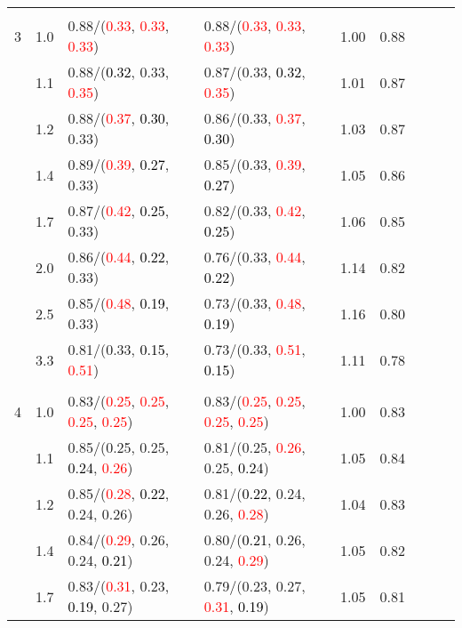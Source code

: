\documentclass[10pt,a4paper]{report}
\begin{document}
\begin{table}[!htbp]
\begin{center}
{\begin{tabular}{ccllccccc}
			&&&&\\
			3			&1.0&0.88/(\textcolor{red}{0.33}, \textcolor{red}{0.33}, \textcolor{red}{0.33})&0.88/(\textcolor{red}{0.33}, \textcolor{red}{0.33}, \textcolor{red}{0.33})&1.00&0.88\\
			&1.1&0.88/(\textcolor{black}{0.32}, 0.33, \textcolor{red}{0.35})&0.87/(0.33, \textcolor{black}{0.32}, \textcolor{red}{0.35})&1.01&0.87\\
			&1.2&0.88/(\textcolor{red}{0.37}, \textcolor{black}{0.30}, 0.33)&0.86/(0.33, \textcolor{red}{0.37}, \textcolor{black}{0.30})&1.03&0.87\\
			&1.4&0.89/(\textcolor{red}{0.39}, \textcolor{black}{0.27}, 0.33)&0.85/(0.33, \textcolor{red}{0.39}, \textcolor{black}{0.27})&1.05&0.86\\
			&1.7&0.87/(\textcolor{red}{0.42}, \textcolor{black}{0.25}, 0.33)&0.82/(0.33, \textcolor{red}{0.42}, \textcolor{black}{0.25})&1.06&0.85\\
			&2.0&0.86/(\textcolor{red}{0.44}, \textcolor{black}{0.22}, 0.33)&0.76/(0.33, \textcolor{red}{0.44}, \textcolor{black}{0.22})&1.14&0.82\\
			&2.5&0.85/(\textcolor{red}{0.48}, \textcolor{black}{0.19}, 0.33)&0.73/(0.33, \textcolor{red}{0.48}, \textcolor{black}{0.19})&1.16&0.80\\
			&3.3&0.81/(0.33, \textcolor{black}{0.15}, \textcolor{red}{0.51})&0.73/(0.33, \textcolor{red}{0.51}, \textcolor{black}{0.15})&1.11&0.78\\
			&&&&\\
			4			&1.0&0.83/(\textcolor{red}{0.25}, \textcolor{red}{0.25}, \textcolor{red}{0.25}, \textcolor{red}{0.25})&0.83/(\textcolor{red}{0.25}, \textcolor{red}{0.25}, \textcolor{red}{0.25}, \textcolor{red}{0.25})&1.00&0.83\\
			&1.1&0.85/(0.25, 0.25, \textcolor{black}{0.24}, \textcolor{red}{0.26})&0.81/(0.25, \textcolor{red}{0.26}, 0.25, \textcolor{black}{0.24})&1.05&0.84\\
			&1.2&0.85/(\textcolor{red}{0.28}, \textcolor{black}{0.22}, 0.24, 0.26)&0.81/(\textcolor{black}{0.22}, 0.24, 0.26, \textcolor{red}{0.28})&1.04&0.83\\
			&1.4&0.84/(\textcolor{red}{0.29}, 0.26, 0.24, \textcolor{black}{0.21})&0.80/(\textcolor{black}{0.21}, 0.26, 0.24, \textcolor{red}{0.29})&1.05&0.82\\
			&1.7&0.83/(\textcolor{red}{0.31}, 0.23, \textcolor{black}{0.19}, 0.27)&0.79/(0.23, 0.27, \textcolor{red}{0.31}, \textcolor{black}{0.19})&1.05&0.81\\

\end{tabular}}
\end{center}
\end{table}
\end{document}
